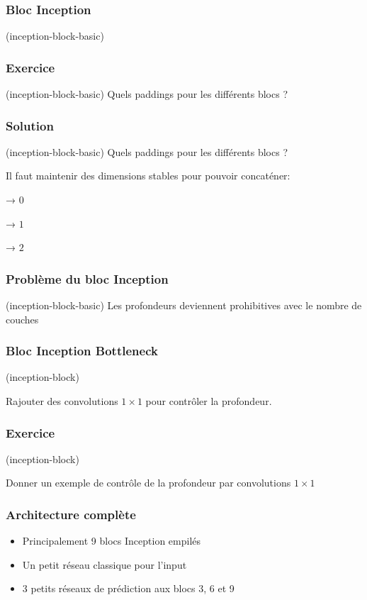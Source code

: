 \documentclass{formation}
\begin{document}
\begin{frame}
  \frametitle{Bloc Inception}
    (inception-block-basic)
\end{frame}

\begin{frame}
  \frametitle{Exercice}
  (inception-block-basic)
  Quels paddings pour les différents blocs ?
\end{frame}

\begin{frame}
  \frametitle{Solution}
  (inception-block-basic)
  Quels paddings pour les différents blocs ?

  Il faut maintenir des dimensions stables pour pouvoir concaténer:
  \pause
  \begin{description}[<+->]
  \item[$1 \times 1$] → $0$
  \item[$3 \times 3$] → $1$
  \item[$5 \times 5$] → $2$
  \end{description}
\end{frame}

\begin{frame}
  \frametitle{Problème du bloc Inception}
  (inception-block-basic)
  Les profondeurs deviennent prohibitives avec le nombre de couches
\end{frame}

\begin{frame}
  \frametitle{Bloc Inception \og Bottleneck\fg}
   (inception-block)

  Rajouter des convolutions $1 \times 1$ pour contrôler la profondeur.
\end{frame}

\begin{frame}
  \frametitle{Exercice}
   (inception-block)

  Donner un exemple de contrôle de la profondeur par convolutions $1
  \times 1$
\end{frame}

\begin{frame}
  \frametitle{Architecture complète}
  \begin{itemize}
  \item Principalement 9 blocs Inception empilés
    
  \item Un \og petit\fg{} réseau classique pour l'input
  \item 3 \og petits \fg{} réseaux de prédiction aux blocs 3, 6 et 9
  \end{itemize}
\end{frame}
\end{document}
